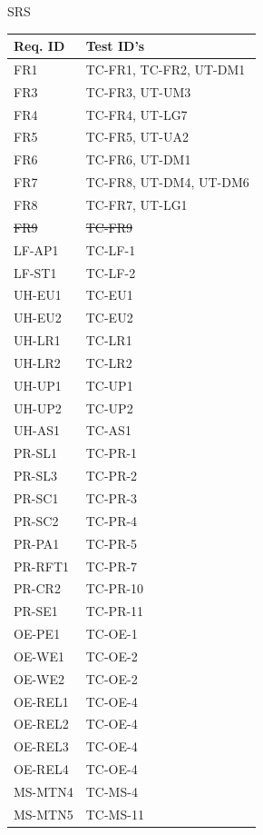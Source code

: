 \documentclass[12pt, titlepage]{article}
\begin{document}
SRS \cite{SRS}

\begin{longtable}{|l|l|}
  \hline
  \textbf{Req. ID} & \textbf{Test ID's} \\
  \hline
  FR1 & TC-FR1, TC-FR2, UT-DM1\\ \hline
  FR3 & TC-FR3, UT-UM3\\ \hline
  FR4 & TC-FR4, UT-LG7\\ \hline
  FR5 & TC-FR5, UT-UA2\\ \hline
  FR6 & TC-FR6, UT-DM1\\ \hline
  FR7 & TC-FR8, UT-DM4, UT-DM6\\ \hline
  FR8 & TC-FR7, UT-LG1\\ \hline
  \sout{FR9} & \sout{TC-FR9}\\ \hline
  LF-AP1 & TC-LF-1 \\ \hline
  LF-ST1 & TC-LF-2 \\ \hline
  UH-EU1 & TC-EU1\\ \hline
  UH-EU2 & TC-EU2\\ \hline
  UH-LR1 & TC-LR1\\ \hline
  UH-LR2 & TC-LR2\\ \hline
  UH-UP1 & TC-UP1\\ \hline
  UH-UP2 & TC-UP2\\ \hline
  UH-AS1 & TC-AS1\\ \hline
  PR-SL1 & TC-PR-1\\ \hline
  PR-SL3 & TC-PR-2\\ \hline
  PR-SC1 & TC-PR-3\\ \hline
  PR-SC2 & TC-PR-4\\ \hline
  PR-PA1 & TC-PR-5\\ \hline
  PR-RFT1 & TC-PR-7\\ \hline
  PR-CR2 & TC-PR-10\\ \hline
  PR-SE1 & TC-PR-11\\ \hline
  OE-PE1 & TC-OE-1 \\ \hline
  OE-WE1 & TC-OE-2 \\ \hline
  OE-WE2 & TC-OE-2 \\ \hline
  OE-REL1 & TC-OE-4 \\ \hline
  OE-REL2 & TC-OE-4 \\ \hline
  OE-REL3 & TC-OE-4 \\ \hline
  OE-REL4 & TC-OE-4 \\ \hline
  MS-MTN4 & TC-MS-4 \\ \hline
  MS-MTN5 & TC-MS-11\\ \hline

\end{longtable}
\end{document}
